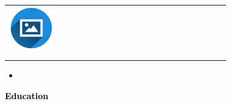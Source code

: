 \documentclass{article}
\begin{document}
\begin{paracol}{2}
\colorbox{maincolor}{%
  \begin{minipage}{\linewidth}
    \begin{tabular}{@{}lp{0.72\linewidth}r}
      \begin{minipage}{0.05\linewidth}
        \includegraphics[width=\linewidth]{picon.png}
      \end{minipage} & 
      {} &  
      {\footnotesize {} {} } \\[-10pt]
      & {\color{sidetext}{}} & \\
      & {\small {} } & \\
    \end{tabular}
\begin{itemize}
    \item 
\end{itemize}
  \end{minipage}%
}


\vspace{1cm}

\textcolor{black}{\Large \textbf{Education}} \\



\end{paracol}
\end{document}

